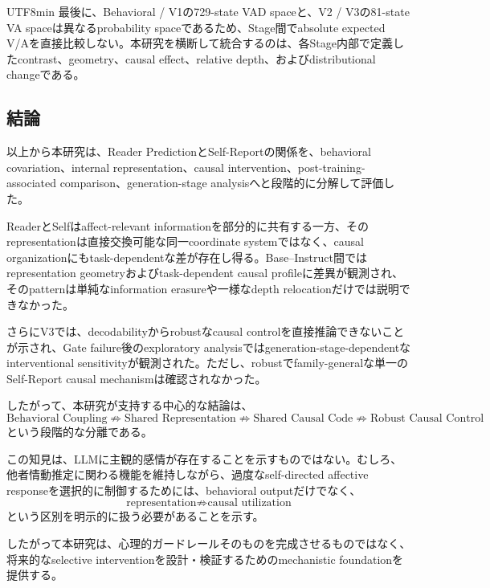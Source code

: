 \documentclass{article} %
\begin{document}
\begin{CJK*}{UTF8}{min}
最後に、Behavioral / V1の729-state VAD spaceと、V2 / V3の81-state VA spaceは異なるprobability spaceであるため、Stage間でabsolute expected V/Aを直接比較しない。本研究を横断して統合するのは、各Stage内部で定義したcontrast、geometry、causal effect、relative depth、およびdistributional changeである。


\subsection{結論}

以上から本研究は、Reader PredictionとSelf-Reportの関係を、behavioral covariation、internal representation、causal intervention、post-training-associated comparison、generation-stage analysisへと段階的に分解して評価した。

ReaderとSelfはaffect-relevant informationを部分的に共有する一方、そのrepresentationは直接交換可能な同一coordinate systemではなく、causal organizationにもtask-dependentな差が存在し得る。Base--Instruct間ではrepresentation geometryおよびtask-dependent causal profileに差異が観測され、そのpatternは単純なinformation erasureや一様なdepth relocationだけでは説明できなかった。

さらにV3では、decodabilityからrobustなcausal controlを直接推論できないことが示され、Gate failure後のexploratory analysisではgeneration-stage-dependentなinterventional sensitivityが観測された。ただし、robustでfamily-generalな単一のSelf-Report causal mechanismは確認されなかった。

したがって、本研究が支持する中心的な結論は、
\[
\text{Behavioral Coupling}
\not\Rightarrow
\text{Shared Representation}
\not\Rightarrow
\text{Shared Causal Code}
\not\Rightarrow
\text{Robust Causal Control}
\]
という段階的な分離である。

この知見は、LLMに主観的感情が存在することを示すものではない。むしろ、他者情動推定に関わる機能を維持しながら、過度なself-directed affective responseを選択的に制御するためには、behavioral outputだけでなく、
\[
\text{representation}
\not\Rightarrow
\text{causal utilization}
\]
という区別を明示的に扱う必要があることを示す。

したがって本研究は、心理的ガードレールそのものを完成させるものではなく、将来的なselective interventionを設計・検証するためのmechanistic foundationを提供する。

\end{CJK*}
\end{document}
